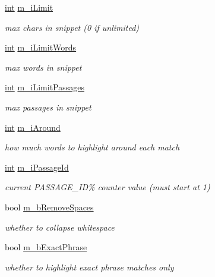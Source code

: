 \begin{DoxyCompactItemize}
\hyperlink{sphinxexpr_8cpp_a4a26e8f9cb8b736e0c4cbf4d16de985e}{int} \hyperlink{structExcerptQuery__t_adff7a09f10dc75c1b4ac651aa044c234}{m\-\_\-i\-Limit}
\begin{DoxyCompactList}\small\item\em max chars in snippet (0 if unlimited) \end{DoxyCompactList}\item 
\hyperlink{sphinxexpr_8cpp_a4a26e8f9cb8b736e0c4cbf4d16de985e}{int} \hyperlink{structExcerptQuery__t_a55c04b93bc46a5471cce09bc8b8144ae}{m\-\_\-i\-Limit\-Words}
\begin{DoxyCompactList}\small\item\em max words in snippet \end{DoxyCompactList}\item 
\hyperlink{sphinxexpr_8cpp_a4a26e8f9cb8b736e0c4cbf4d16de985e}{int} \hyperlink{structExcerptQuery__t_a793c2666d549c8f5826044b3cf2425f1}{m\-\_\-i\-Limit\-Passages}
\begin{DoxyCompactList}\small\item\em max passages in snippet \end{DoxyCompactList}\item 
\hyperlink{sphinxexpr_8cpp_a4a26e8f9cb8b736e0c4cbf4d16de985e}{int} \hyperlink{structExcerptQuery__t_a13198e1020e950c386b064a12e7f2c04}{m\-\_\-i\-Around}
\begin{DoxyCompactList}\small\item\em how much words to highlight around each match \end{DoxyCompactList}\item 
\hyperlink{sphinxexpr_8cpp_a4a26e8f9cb8b736e0c4cbf4d16de985e}{int} \hyperlink{structExcerptQuery__t_a540b5cd5733b6116381572859dcc3945}{m\-\_\-i\-Passage\-Id}
\begin{DoxyCompactList}\small\item\em current P\-A\-S\-S\-A\-G\-E\-\_\-\-I\-D\% counter value (must start at 1) \end{DoxyCompactList}\item 
bool \hyperlink{structExcerptQuery__t_a29a10c764dff6050c8e326ffdf7809de}{m\-\_\-b\-Remove\-Spaces}
\begin{DoxyCompactList}\small\item\em whether to collapse whitespace \end{DoxyCompactList}\item 
bool \hyperlink{structExcerptQuery__t_a4d92e1b0d1a788f90c60d2def2f0e4e0}{m\-\_\-b\-Exact\-Phrase}
\begin{DoxyCompactList}\small\item\em whether to highlight exact phrase matches only \end{DoxyCompactList}\item 

\end{DoxyCompactItemize}
